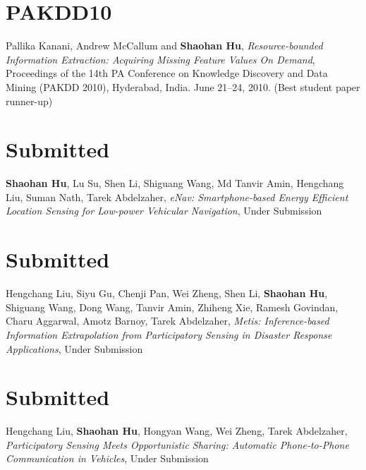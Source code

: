 \section{\sc PAKDD10}
Pallika Kanani, Andrew McCallum and \textbf{Shaohan Hu},
\emph{Resource-bounded Information Extraction: Acquiring Missing
  Feature Values On Demand}, \textsf{Proceedings of the 14th PA
  Conference on Knowledge Discovery and Data Mining (PAKDD 2010)},
Hyderabad, India. June 21--24, 2010. (Best student paper runner-up)

\section{\sc Submitted}
\textbf{Shaohan Hu}, Lu Su, Shen Li, Shiguang Wang, Md Tanvir Amin,
Hengchang Liu, Suman Nath, Tarek Abdelzaher, \emph{eNav:
  Smartphone-based Energy Efficient Location Sensing for Low-power
  Vehicular Navigation}, \textsf{Under Submission} %

\section{\sc Submitted}
Hengchang Liu, Siyu Gu, Chenji Pan, Wei Zheng, Shen Li,
\textbf{Shaohan Hu}, Shiguang Wang, Dong Wang, Tanvir Amin, Zhiheng
Xie, Ramesh Govindan, Charu Aggarwal, Amotz Barnoy, Tarek Abdelzaher,
\emph{Metis: Inference-based Information Extrapolation from
  Participatory Sensing in Disaster Response Applications},
\textsf{Under Submission} %

\section{\sc Submitted}
Hengchang Liu, \textbf{Shaohan Hu}, Hongyan Wang, Wei Zheng, Tarek
Abdelzaher, \emph{Participatory Sensing Meets Opportunistic Sharing:
  Automatic Phone-to-Phone Communication in Vehicles}, \textsf{Under
  Submission} %
